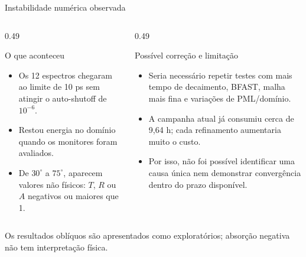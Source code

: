 \documentclass[aspectratio=169,10pt]{beamer}
\begin{document}
\begin{frame}{Instabilidade numérica observada}
\begin{columns}[T,onlytextwidth]
  \begin{column}{0.49\textwidth}
    \begin{block}{O que aconteceu}
    \normalsize
    \begin{itemize}\setlength\itemsep{0.55em}
      \item Os 12 espectros chegaram ao limite de 10 ps sem atingir o auto-shutoff de $10^{-6}$.
      \item Restou energia no domínio quando os monitores foram avaliados.
      \item De $30^\circ$ a $75^\circ$, aparecem valores não físicos: $T$, $R$ ou $A$ negativos ou maiores que 1.
    \end{itemize}
    \end{block}
  \end{column}
  \begin{column}{0.49\textwidth}
    \begin{block}{Possível correção e limitação}
    \normalsize
    \begin{itemize}\setlength\itemsep{0.55em}
      \item Seria necessário repetir testes com mais tempo de decaimento, BFAST, malha mais fina e variações de PML/domínio.
      \item A campanha atual já consumiu cerca de 9,64 h; cada refinamento aumentaria muito o custo.
      \item Por isso, não foi possível identificar uma causa única nem demonstrar convergência dentro do prazo disponível.
    \end{itemize}
    \end{block}
  \end{column}
\end{columns}
\vspace{0.15cm}
\centering
\alert{Os resultados oblíquos são apresentados como exploratórios; absorção negativa não tem interpretação física.}
\end{frame}
\end{document}
